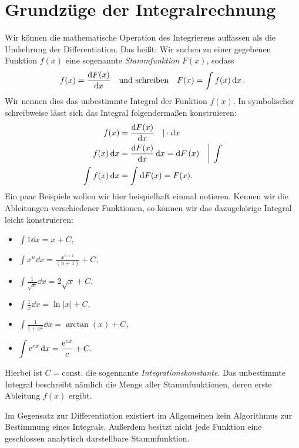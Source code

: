 \thispagestyle{plain}
\section{Grundzüge der Integralrechnung}

Wir können die mathematische Operation des Integrierens auffassen als die Umkehrung der Differentiation. Das heißt: Wir suchen zu einer gegebenen Funktion $f(x)$ eine sogenannte \emph{Stammfunktion} $F(x)$, sodass 
\begin{align}
    f(x) = \dv{F(x)}{x} \qq{und schreiben} F(x) = \int f(x) \dd{x}.
\end{align}
Wir nennen dies das unbestimmte Integral der Funktion $f(x)$. In symbolischer schreibweise lässt sich das Integral folgendermaßen konstruieren: 
\begin{align}
    f(x) &= \dv{F(x)}{x} \quad |\cdot \dd{x} \notag \\
    f(x) \dd{x} &= \dv{F(x)}{x}\dd{x} = \dd{F}(x) \quad \bigg|\; \int \notag \\
    \int f(x) \dd{x} &= \int \dd{F(x)} = F(x).    
\end{align}
Ein paar Beispiele wollen wir hier beispielhaft einmal notieren. Kennen wir die Ableitungen verschiedener Funktionen, so können wir das dazugehörige Integral leicht konstruieren: 
\begin{multicols}{2}
    \begin{itemize}
        \item $\displaystyle \int 1 \dd{x} = x + C,$
        \item $\displaystyle \int x^n \dd{x} = \frac{x^{n+1}}{(n+1)} + C,$
        \item $\displaystyle \int \frac{1}{\sqrt{x}} \dd{x} = 2\sqrt{x} + C,$
        \item $\displaystyle \int \frac{1}{x} \dd{x} = \ln|x| + C,$
        \item $\displaystyle \int \frac{1}{1+x^2} \dd{x} = \arctan(x) + C,$
        \item $\displaystyle \int \mathrm{e}^{cx} \dd{x} = \frac{\mathrm{e}^{cx}}{c} + C.$
    \end{itemize}
\end{multicols}
Hierbei ist $C = \text{const.}$ die sogennante \emph{Integrationskonstante}. Das unbestimmte Integral beschreibt nämlich die Menge aller Stammfunktionen, deren erste Ableitung $f(x)$ ergibt. 

Im Gegensatz zur Differentiation existiert im Allgemeinen kein Algorithmus zur Bestimmung eines Integrals. Außerdem besitzt nicht jede Funktion eine geschlossen analytisch darstellbare Stammfunktion.

